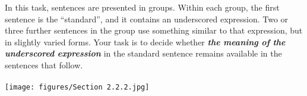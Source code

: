 \ea\label{ex:40} 
{\small In this task, sentences are presented in groups.  Within each group, the first sentence is the “standard”, and it contains an underscored expression.  Two or three further sentences in the group use something similar to that expression, but in slightly varied forms.  Your task is to decide whether \textbf{\textit{the} \textit{meaning} \textit{of} \textit{the} \textit{underscored} \textit{expression}} in the standard sentence remains available in the sentences that follow. } \\
 \bigskip
\\
 \texttt{[image: figures/Section 2.2.2.jpg]}
\z

